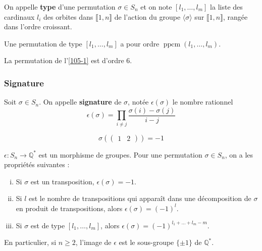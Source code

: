 	\begin{definition}
		On appelle \textbf{type} d'une permutation $\sigma \in S_n$ et on note $[l_1, \dots, l_m]$ la liste des cardinaux $l_i$ des orbites dans $\llbracket 1, n \rrbracket$ de l'action du groupe $\langle \sigma \rangle$ sur $\llbracket 1, n \rrbracket$, rangée dans l'ordre croissant.
	\end{definition}
	
	\begin{proposition}
		Une permutation de type $[l_1, \dots, l_m]$ a pour ordre $\operatorname{ppcm}(l_1, \dots, l_m)$.
	\end{proposition}
	
	\begin{example}
		La permutation de l'\cref{105-1} est d'ordre $6$.
	\end{example}
	
	\subsubsection{Signature}
	
	\begin{definition}
		Soit $\sigma \in S_n$. On appelle \textbf{signature} de $\sigma$, notée $\epsilon(\sigma)$ le nombre rationnel
		\[ \epsilon(\sigma) = \prod_{i \neq j} \frac{\sigma(i) - \sigma(j)}{i-j} \]
	\end{definition}
	
	\begin{example}
		\[ \sigma(\begin{pmatrix} 1 & 2 \end{pmatrix}) = -1 \]
	\end{example}
	
	\begin{proposition}
		$\epsilon : S_n \rightarrow \mathbb{Q}^*$ est un morphisme de groupes. Pour une permutation $\sigma \in S_n$, on a les propriétés suivantes :
		\begin{enumerate}[(i)]
			\item Si $\sigma$ est un transposition, $\epsilon(\sigma) = -1$.
			\item Si $l$ est le nombre de transpositions qui apparaît dans une décomposition de $\sigma$ en produit de transpositions, alors $\epsilon(\sigma) = (-1)^l$.
			\item Si $\sigma$ est de type $[l_1, \dots, l_m]$, alors $\epsilon(\sigma) = (-1)^{l_1 + \dots + l_m - m}$.
		\end{enumerate}
		En particulier, si $n \geq 2$, l'image de $\epsilon$ est le sous-groupe $\{ \pm 1 \}$ de $\mathbb{Q}^*$.
	\end{proposition}
	
